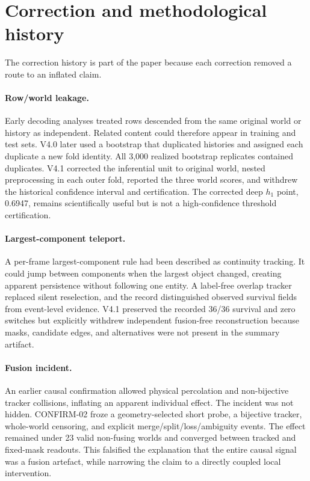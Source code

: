 \documentclass[11pt]{article}
\begin{document}
\section{Correction and methodological history}

The correction history is part of the paper because each correction removed a route to an inflated claim.

\paragraph{Row/world leakage.}
Early decoding analyses treated rows descended from the same original world or history as independent. Related content could therefore appear in training and test sets. V4.0 later used a bootstrap that duplicated histories and assigned each duplicate a new fold identity. All 3,000 realized bootstrap replicates contained duplicates. V4.1 corrected the inferential unit to original world, nested preprocessing in each outer fold, reported the three world scores, and withdrew the historical confidence interval and certification. The corrected deep $h_1$ point, 0.6947, remains scientifically useful but is not a high-confidence threshold certification.

\paragraph{Largest-component teleport.}
A per-frame largest-component rule had been described as continuity tracking. It could jump between components when the largest object changed, creating apparent persistence without following one entity. A label-free overlap tracker replaced silent reselection, and the record distinguished observed survival fields from event-level evidence. V4.1 preserved the recorded 36/36 survival and zero switches but explicitly withdrew independent fusion-free reconstruction because masks, candidate edges, and alternatives were not present in the summary artifact.

\paragraph{Fusion incident.}
An earlier causal confirmation allowed physical percolation and non-bijective tracker collisions, inflating an apparent individual effect. The incident was not hidden. CONFIRM-02 froze a geometry-selected short probe, a bijective tracker, whole-world censoring, and explicit merge/split/loss/ambiguity events. The effect remained under 23 valid non-fusing worlds and converged between tracked and fixed-mask readouts. This falsified the explanation that the entire causal signal was a fusion artefact, while narrowing the claim to a directly coupled local intervention.
\end{document}
